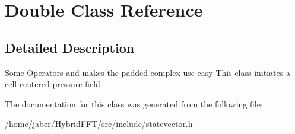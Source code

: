 \hypertarget{classDouble}{}\section{Double Class Reference}
\label{classDouble}


\subsection{Detailed Description}
Some Operators and makes the padded complex use easy This class initiates a cell centered pressure field 

The documentation for this class was generated from the following file\+:\begin{DoxyCompactItemize}
\item 
/home/jaber/\+Hybrid\+F\+F\+T/src/include/statevector.\+h\end{DoxyCompactItemize}
